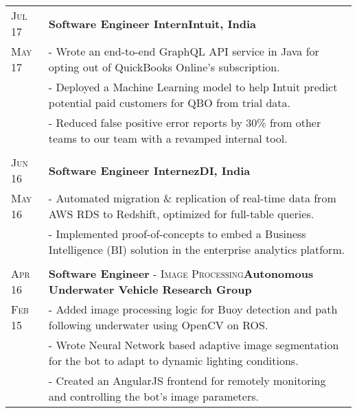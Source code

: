 \documentclass[a4paper,10pt]{extarticle} %
\begin{document}
\begin{tabularx}{\linewidth}{ l | X }
\textsc{Jul 17} & \textbf{Software Engineer Intern}\hfill\textbf{Intuit, India}\\
\textsc{May 17}& {- Wrote an end-to-end GraphQL API service in Java for opting out of QuickBooks Online's subscription.}\\
& {- Deployed a Machine Learning model to help Intuit predict potential paid customers for QBO from trial data.}\\
& {- Reduced false positive error reports by 30\% from other teams to our team with a revamped internal tool.}\\
\multicolumn{2}{c}{} \\

\textsc{Jun 16} & \textbf{Software Engineer Intern}\hfill\textbf{ezDI, India}\\
\textsc{May 16}& {- Automated migration \& replication of real-time data from AWS RDS to Redshift, optimized for full-table queries.}\\
& {- Implemented proof-of-concepts to embed a Business Intelligence (BI) solution in the enterprise analytics platform.}\\
\multicolumn{2}{c}{} \\

\textsc{Apr 16} & \textbf{Software Engineer} \textsc{- Image Processing}\hfill\textbf{Autonomous Underwater Vehicle Research Group}\\
\textsc{Feb 15} & {- Added image processing logic for Buoy detection and path following underwater using OpenCV on ROS.}\\
& {- Wrote Neural Network based adaptive image segmentation for the bot to adapt to dynamic lighting conditions.}\\
& {- Created an AngularJS frontend for remotely monitoring and controlling the bot's image parameters.}\\
\end{tabularx}

\end{document}

